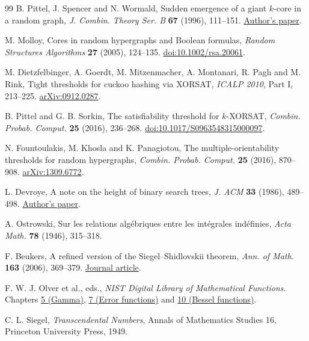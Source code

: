 \documentclass[11pt,a4paper]{article}
\theoremstyle{definition}
\theoremstyle{remark}
\begin{document}
\begin{thebibliography}{99}
\small
{} B. Pittel, J. Spencer and N. Wormald,
Sudden emergence of a giant $k$-core in a random graph,
\emph{J. Combin. Theory Ser. B} \textbf{67} (1996), 111--151.
\href{https://cs.nyu.edu/~spencer/papers/k-core.pdf}{Author's paper}.

 M. Molloy, Cores in random hypergraphs and Boolean formulas,
\emph{Random Structures Algorithms} \textbf{27} (2005), 124--135.
\href{https://doi.org/10.1002/rsa.20061}{doi:10.1002/rsa.20061}.

 M. Dietzfelbinger, A. Goerdt, M. Mitzenmacher, A. Montanari,
R. Pagh and M. Rink, Tight thresholds for cuckoo hashing via XORSAT,
\emph{ICALP 2010}, Part I, 213--225.
\href{https://arxiv.org/abs/0912.0287}{arXiv:0912.0287}.

 B. Pittel and G. B. Sorkin, The satisfiability threshold for
$k$-XORSAT, \emph{Combin. Probab. Comput.} \textbf{25} (2016), 236--268.
\href{https://doi.org/10.1017/S0963548315000097}{doi:10.1017/S0963548315000097}.

 N. Fountoulakis, M. Khosla and K. Panagiotou,
The multiple-orientability thresholds for random hypergraphs,
\emph{Combin. Probab. Comput.} \textbf{25} (2016), 870--908.
\href{https://arxiv.org/abs/1309.6772}{arXiv:1309.6772}.

 L. Devroye, A note on the height of binary search trees,
\emph{J. ACM} \textbf{33} (1986), 489--498.
\href{https://luc.devroye.org/devroye_1986_univ_a_note_on_the_height_of_binary_search_trees.pdf}{Author's paper}.

 A. Ostrowski, Sur les relations alg\'ebriques entre les int\'egrales ind\'efinies, \emph{Acta Math.} \textbf{78} (1946), 315--318.

 F. Beukers, A refined version of the Siegel--Shidlovskii theorem, \emph{Ann. of Math.} \textbf{163} (2006), 369--379. \href{https://annals.math.princeton.edu/2006/163-1/p08}{Journal article}.

 F. W. J. Olver et al., eds., \emph{NIST Digital Library of Mathematical Functions}. Chapters \href{https://dlmf.nist.gov/5}{5 (Gamma)}, \href{https://dlmf.nist.gov/7}{7 (Error functions)} and \href{https://dlmf.nist.gov/10}{10 (Bessel functions)}.

 C. L. Siegel, \emph{Transcendental Numbers}, Annals of Mathematics Studies 16, Princeton University Press, 1949.


\end{thebibliography}
\end{document}
